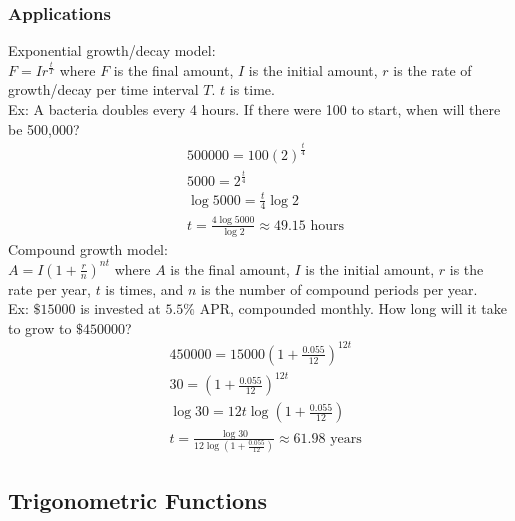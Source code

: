 \documentclass[11pt, fleqn]{article}
\begin{document}
\subsubsection{Applications}
Exponential growth/decay model:\\
$F=Ir^{\frac{t}{T}}$ where $F$ is the final amount, $I$ is the initial amount, $r$ is the rate of growth/decay per time interval $T$. $t$ is time.\\
Ex: A bacteria doubles every 4 hours. If there were 100 to start, when will there be 500,000?
\begin{align*}
    &500000=100(2)^{\frac{t}{4}}\\
    &5000=2^\frac{t}{4}\\
    &\log5000=\frac{t}{4}\log2\\
    &t=\frac{4\log5000}{\log2}\approx49.15\text{ hours}
\end{align*}
Compound growth model:\\
$A=I\left(1+\frac{r}{n}\right)^{nt}$ where $A$ is the final amount, $I$ is the initial amount, $r$ is the rate per year, $t$ is times, and $n$ is the number of compound periods per year.\\
Ex: $\$15000$ is invested at $5.5\%$ APR, compounded monthly. How long will it take to grow to $\$450000$?
\begin{align*}
    &450000=15000\left(1+\frac{0.055}{12}\right)^{12t}\\
    &30=\left(1+\frac{0.055}{12}\right)^{12t}\\
    &\log30=12t\log\left(1+\frac{0.055}{12}\right)\\
    &t=\frac{\log30}{12\log\left(1+\frac{0.055}{12}\right)}\approx61.98\text{ years}
\end{align*}










\subsection{Trigonometric Functions}
\end{document}
